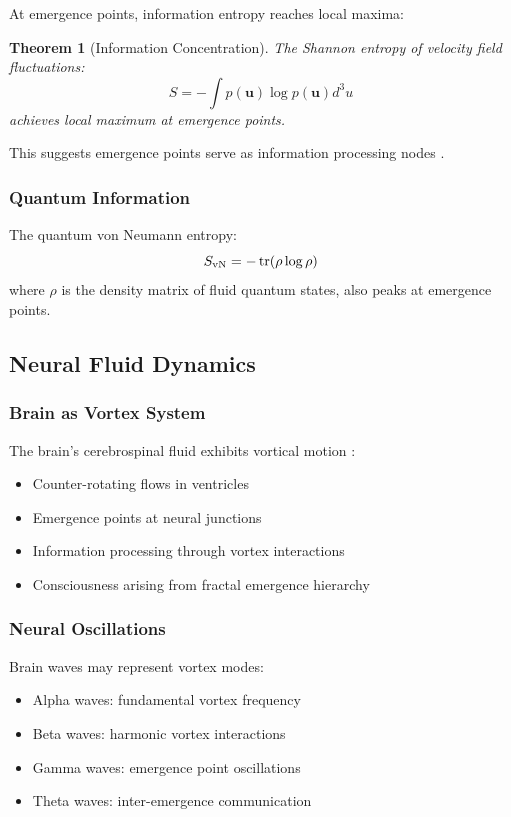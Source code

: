 \documentclass[12pt]{article}
\newtheorem{theorem}{Theorem}[section]
\begin{document}
At emergence points, information entropy reaches local maxima:

\begin{theorem}[Information Concentration]
The Shannon entropy of velocity field fluctuations:
\begin{equation}
S = -\int p(\mathbf{u}) \log p(\mathbf{u}) d^3u
\end{equation}
achieves local maximum at emergence points.
\end{theorem}

This suggests emergence points serve as information processing nodes \cite{shannon1948,landauer1961}.

\subsubsection{Quantum Information}

The quantum von Neumann entropy:
\begin{equation}
S_{\text{vN}} = -\tr(\rho \log \rho)
\end{equation}
where $\rho$ is the density matrix of fluid quantum states, also peaks at emergence points.

\subsection{Neural Fluid Dynamics}

\subsubsection{Brain as Vortex System}

The brain's cerebrospinal fluid exhibits vortical motion \cite{wagshul2011}:
\begin{itemize}
\item Counter-rotating flows in ventricles
\item Emergence points at neural junctions
\item Information processing through vortex interactions
\item Consciousness arising from fractal emergence hierarchy
\end{itemize}

\subsubsection{Neural Oscillations}

Brain waves may represent vortex modes:
\begin{itemize}
\item Alpha waves: fundamental vortex frequency
\item Beta waves: harmonic vortex interactions
\item Gamma waves: emergence point oscillations
\item Theta waves: inter-emergence communication
\end{itemize}
\end{document}

